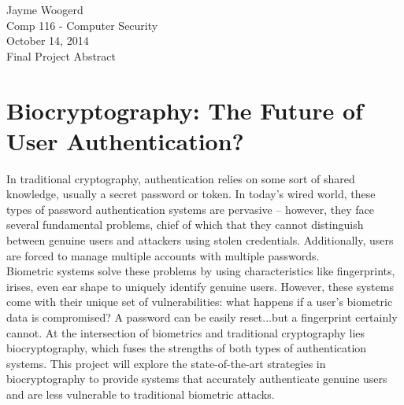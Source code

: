 \documentclass[11pt]{article}
\begin{document}
Jayme Woogerd \\
\indent Comp 116 - Computer Security \\
\indent October 14, 2014 \\
\indent Final Project Abstract \\

\section*{Biocryptography: The Future of User Authentication?}
In traditional cryptography, authentication relies on some sort of shared knowledge,
usually a secret password or token. In today's wired world, these types of password
authentication systems are pervasive -- however, they face several fundamental
problems, chief of which that they cannot distinguish between genuine users and
attackers using stolen credentials. Additionally, users are forced to manage 
multiple accounts with multiple passwords.  \\
Biometric systems solve these problems by using characteristics like fingerprints,
irises, even ear shape to uniquely identify genuine users. However, these
systems come with their unique set of vulnerabilities: what happens if a user's
biometric data is compromised? A password can be easily reset...but a fingerprint
certainly cannot. At the intersection of biometrics and traditional cryptography
lies biocryptography, which fuses the strengths of both types of authentication systems.
This project will explore the state-of-the-art strategies in biocryptography to
provide systems that accurately authenticate genuine users and are less 
vulnerable to traditional biometric attacks.
\end{document}
